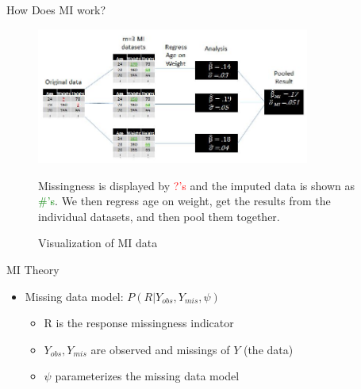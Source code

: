 \begin{frame}{How Does MI work?}
 \begin{figure}[h!]
  \centering
    \includegraphics[width=0.8\textwidth]{mi_example_full.jpg}
  \caption{Visualization of MI data}
\label{fig:miexample}
\medskip
\small
Missingness is displayed by \textcolor{red}{?'s} and the imputed data is shown  as \textcolor{green}{\#'s}.
We then regress age on weight, get the results from the individual datasets, and then pool them together.
\end{figure}
\end{frame}

\begin{frame}{MI Theory}
 \begin{itemize}
  \item Missing data model: $P(R|Y_{obs},Y_{mis},\psi)$
  \begin{itemize}
     \item R is the response missingness indicator
   \item $Y_{obs},Y_{mis}$ are observed and missings of $Y$ (the data)
   \item $\psi$ parameterizes the missing data model
  \end{itemize}

 \end{itemize}

\end{frame}


